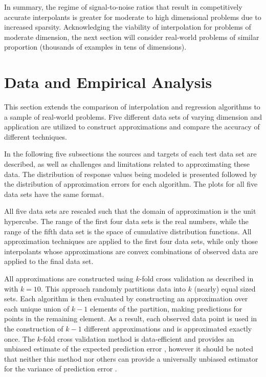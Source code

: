 In summary, the regime of signal-to-noise ratios that result in
competitively accurate interpolants is greater for moderate to high
dimensional problems due to increased sparsity. Acknowledging the
viability of interpolation for problems of moderate dimension, the
next section will consider real-world problems of similar proportion
(thousands of examples in tens of dimensions).


\vspace{-2mm}
\section{Data and Empirical Analysis}
\label{sec:error_data}

This section extends the comparison of interpolation and regression
algorithms to a sample of real-world problems. Five different data
sets of varying dimension and application are utilized to construct
approximations and compare the accuracy of different techniques.

In the following five subsections the sources and targets of each test
data set are described, as well as challenges and limitations related
to approximating these data. The distribution of response values being
modeled is presented followed by the distribution of approximation
errors for each algorithm. The plots for all five data sets have the
same format.

All five data sets are rescaled such that the domain of approximation
is the unit hypercube. The range of the first four data sets is the
real numbers, while the range of the fifth data set is the space of
cumulative distribution functions. All approximation techniques are
applied to the first four data sets, while only those interpolants
whose approximations are convex combinations of observed data are
applied to the final data set.

All approximations are constructed using $k$-fold cross validation as
described in \cite{kohavi1995study} with $k=10$. This approach
randomly partitions data into $k$ (nearly) equal sized sets. Each
algorithm is then evaluated by constructing an approximation over each
unique union of $k-1$ elements of the partition, making predictions
for points in the remaining element. As a result, each observed data
point is used in the construction of $k-1$ different approximations
and is approximated exactly once. The $k$-fold cross validation method
is data-efficient and provides an unbiased estimate of the expected
prediction error \cite{kohavi1995study}, however it should be noted
that neither this method nor others can provide a universally unbiased
estimator for the variance of prediction error \cite{bengio2004no}.

